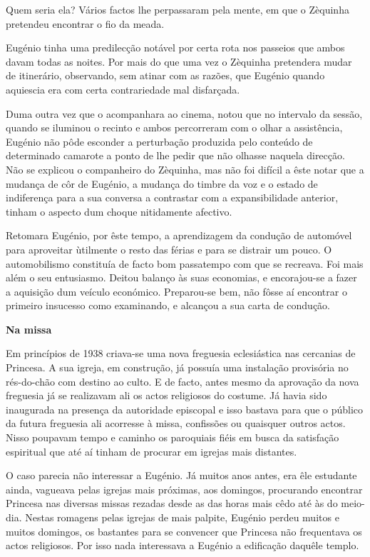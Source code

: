\documentclass[9pt]{article}
\begin{document}
Quem seria ela? Vários factos lhe perpassaram pela mente, em que o
Zèquinha pretendeu encontrar o fio da meada.

Eugé\-nio tinha uma predilec\-ção notável por certa rota nos passeios
que ambos davam todas as noites. Por mais do que uma vez o Zèquinha pretendera mudar de itinerário, observando, sem atinar com as razões, que Eugé\-nio
quan\-do aquiescia era com certa contrariedade mal dis\-far\-ça\-da.

Duma outra vez que o acompanhara ao cinema, notou que no intervalo
da sessão, quan\-do se iluminou o recinto e ambos percorreram com o o\-lhar
a assistência, Eugé\-nio não pôde esconder a perturba\-ção produzida pelo conteúdo de determinado camarote a ponto de lhe pedir que não o\-lhasse naquela direc\-ção. Não se explicou o companheiro do Zèquinha, mas não
foi difícil a êste notar que a mudan\-ça de côr de Eugé\-nio, a mudan\-ça do timbre da voz e o estado de indiferença para a sua conversa a contrastar com
a expansibilidade anterior, tinham o aspecto dum choque nitidamente afectivo.

Retomara Eugé\-nio, por êste tempo, a aprendizagem da condu\-ção de automóvel para aproveitar ùtilmente o resto das férias e para se distrair
um pouco. O automobilismo constituía de facto bom passatempo com que
se recreava. Foi mais além o seu entusiasmo. Deitou balanço às suas
economias, e encorajou-se a fazer a aquisi\-ção dum veículo económico. Preparou-se bem, não fôsse aí encontrar o primeiro insucesso como examinando, e alcançou a sua carta de condu\-ção.

\begin{center}\bf\large Na missa\end{center}

Em princípios de 1938 criava-se uma nova freguesia eclesiástica nas
cercanias de Princesa. A sua igreja, em constru\-ção, já possuía uma instala\-ção provisória no rés-do-chão com destino ao culto. E de facto, antes
mesmo da aprova\-ção da nova freguesia já se realizavam ali os actos religiosos do costume. Já havia sido inaugurada na presença da autoridade episcopal e isso bastava para que o público da futura freguesia ali acorresse
à missa, confissões ou quaisquer outros actos. Nisso poupavam tempo e caminho os paroquiais fiéis em busca da satisfa\-ção espiritual que até aí tinham
de procurar em igrejas mais distantes.

O caso parecia não interessar a Eugé\-nio. Já muitos anos antes, era êle
estudante ainda, vagueava pelas igrejas mais próximas, aos domingos, procurando encontrar Princesa nas diversas missas rezadas desde as das horas
mais cêdo até às do meio-dia. Nestas romagens pelas igrejas de mais palpite, Eugé\-nio perdeu muitos e muitos domingos, os bastantes para se convencer
que Princesa não frequentava os actos religiosos. Por isso nada interessava a Eugé\-nio a edifi\-ca\-ção da\-quê\-le templo.
\end{document}
